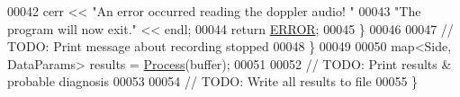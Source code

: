 \begin{DoxyCode}
00042             cerr << \textcolor{stringliteral}{"An error occurred reading the doppler audio! "}
00043                 \textcolor{stringliteral}{"The program will now exit."} << endl;
00044             \textcolor{keywordflow}{return} \hyperlink{definitions_8hpp_a8fe83ac76edc595f6b98cd4a4127aed5}{ERROR};
00045         \}
00046 
00047         \textcolor{comment}{// TODO: Print message about recording stopped}
00048     \}
00049 
00050     map<Side, DataParams> results = \hyperlink{namespacevaso_a852067e19b0bcfebb4fa6674c7c8d67f}{Process}(buffer);
00051 
00052     \textcolor{comment}{// TODO: Print results & probable diagnosis}
00053 
00054     \textcolor{comment}{// TODO: Write all results to file}
00055 \}
\end{DoxyCode}
